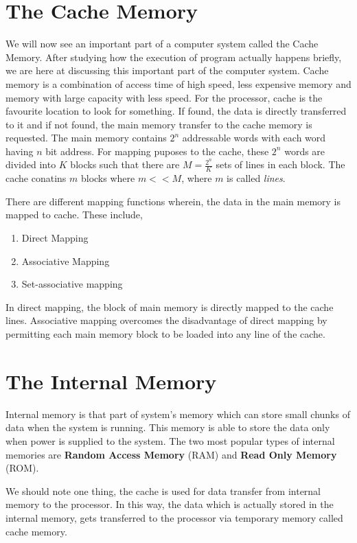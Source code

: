\documentclass{article}
\begin{document}
\section{The Cache Memory}
We will now see an important part of a computer system called the Cache Memory. After studying how the execution of program actually happens briefly, we are here at discussing this important part of the computer system. Cache memory is a combination of access time of high speed, less expensive memory and memory with large capacity with less speed. For the processor, cache is the favourite location to look for something. If found, the data is directly transferred to it and if not found, the main memory transfer to the cache memory is requested. The main memory contains $2^{n}$ addressable words with each word having $n$ bit address. For mapping puposes to the cache, these $2^{n}$ words are divided into $K$ blocks such that there are $\displaystyle M = \frac{2^{n}}{K}$ sets of lines in each block. The cache conatins $m$ blocks where $m << M$, where $m$ is called \textit{lines}. \par There are different mapping functions wherein, the data in the main memory is mapped to cache. These include,
\begin{enumerate}
\item Direct Mapping
\item Associative Mapping
\item Set-associative mapping
\end{enumerate}
In direct mapping, the block of main memory is directly mapped to the cache lines. Associative mapping overcomes the disadvantage of direct mapping by permitting each main memory block to be loaded into any line of the cache.

\section{The Internal Memory}
Internal memory is that part of system's memory which can store small chunks of data when the system is running. This memory is able to store the data only when power is supplied to the system. The two most popular types of internal memories are \textbf{Random Access Memory} (RAM) and \textbf{Read Only Memory} (ROM). \par We should note one thing, the cache is used for data transfer from internal memory to the processor. In this way, the data which is actually stored in the internal memory, gets transferred to the processor via temporary memory called cache memory.
\end{document}
